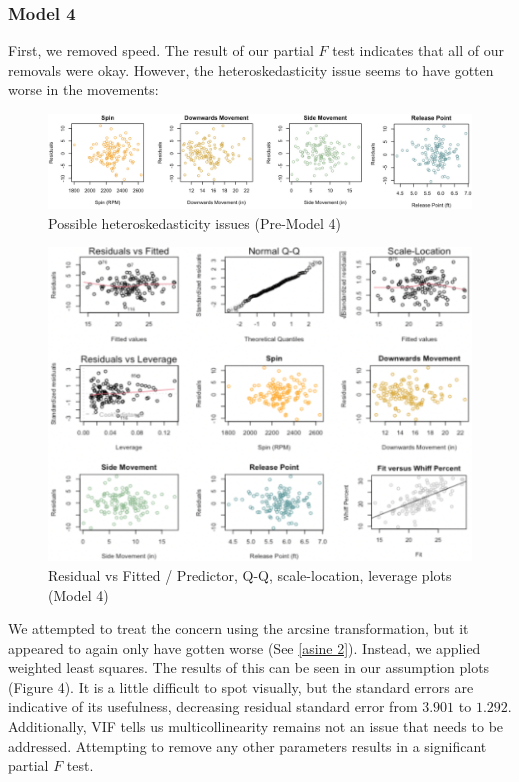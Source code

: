\documentclass[12pt]{article}
\begin{document}
\subsubsection{Model 4}
First, we removed speed. The result of our partial $F$ test indicates that all of our removals were okay. However, the heteroskedasticity issue seems to have gotten worse in the movements:
\begin{figure}[h]
    \begin{centering}
        \includegraphics[scale = 0.25]{pics/heteroskedasticity.jpeg}
    \caption{Possible heteroskedasticity issues (Pre-Model 4)}
    \end{centering}
\end{figure}

\begin{figure}[h]
    \begin{centering}
        \includegraphics[scale = 0.38]{pics/mod 2 assumptions.png}
    \caption{Residual vs Fitted / Predictor, Q-Q, scale-location, leverage plots (Model 4)}
    \end{centering}
\end{figure}

We attempted to treat the concern using the arcsine transformation, but it appeared to again only have gotten worse (See \ref{asine 2}). Instead, we applied weighted least squares. The results of this can be seen in our assumption plots (Figure 4). It is a little difficult to spot visually, but the standard errors are indicative of its usefulness, decreasing residual standard error from $3.901$ to $1.292$. Additionally, VIF tells us multicollinearity remains not an issue that needs to be addressed. Attempting to remove any other parameters results in a significant partial $F$ test.
\end{document}
